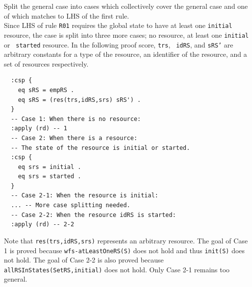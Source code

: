 \documentclass[12pt]{report}
\newcommand{\stt}[1]{{\small{\tt {#1}}}}
\begin{document}
 Split the general case into cases which
collectively cover the general case and one of which matches to LHS of
the first rule. \\ Since LHS of rule {\tt R01} requires the global
state to have at least one {\tt initial} resource, the case is split
into three more cases; no resource, at least one {\tt initial} or {\tt
  started} resource. In the following proof score, {\tt trs}, {\tt
  idRS}, and {\tt sRS'} are arbitrary constants for a type of the
resource, an identifier of the resource, and a set of resources
respectively. 
\small
\begin{verbatim}
  :csp { 
    eq sRS = empRS .
    eq sRS = (res(trs,idRS,srs) sRS') .
  }
  -- Case 1: When there is no resource:
  :apply (rd) -- 1
  -- Case 2: When there is a resource:
  -- The state of the resource is initial or started.
  :csp { 
    eq srs = initial .
    eq srs = started .
  }
  -- Case 2-1: When the resource is initial:
  ... -- More case splitting needed.
  -- Case 2-2: When the resource idRS is started:
  :apply (rd) -- 2-2
\end{verbatim}
\normalsize
Note that \stt{res(trs,idRS,srs)} represents an arbitrary resource.
The goal of Case 1 is proved because \stt{wfs-atLeastOneRS(S)} does
not hold and thus \stt{init(S)} does not hold. The goal of Case 2-2 is
also proved because \stt{allRSInStates(SetRS,initial)} does not hold.
Only Case 2-1 remains too general.\\
\end{document}

